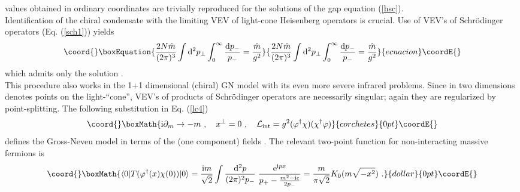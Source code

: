 \documentclass[a4paper,12pt]{article}
\begin{document}
values obtained in ordinary coordinates are trivially reproduced for the solutions of the gap equation
(\ref{hsc}).\\
Identification of the chiral condensate with the limiting  VEV of light-cone Heisenberg operators is
crucial. Use of VEV's of Schr\"odinger operators (Eq. (\ref{sch1})) yields
\begin{equation}\coord{}\boxEquation{
  \label{njlv}
\frac{2N\hat{m}}{(2 \pi)^{3}} \int {\rm d}^{2}p_{\perp}
    \int^{\infty}_{0} \frac{{\rm d} p _{-}}{p_{-}}  =  \frac{\hat{m}}{g^2}
}{
  \frac{2N\hat{m}}{(2 \pi)^{3}} \int {\rm d}^{2}p_{\perp}
    \int^{\infty}_{0} \frac{{\rm d} p _{-}}{p_{-}}  =  \frac{\hat{m}}{g^2}
}{ecuacion}\coordE{}\end{equation}
which admits only the solution \coordHE{}. \\
This  procedure also works in the 1+1 dimensional (chiral) GN model with its even more severe
infrared problems. Since in two dimensions \coordHE{} denotes points on the light-``cone'', VEV's
of products of Schr\"odinger operators are necessarily singular;  again they are regularized by
point-splitting. The following substitution in Eq. (\ref{lc4})
\begin{displaymath}\coord{}\boxMath{
  {\rm i}\partial_{m} \rightarrow -m \ , \quad x^{\perp} =0\ , \quad
 {\cal L}_{\rm int} = g^{2}(\varphi^{\dagger}\chi)(
  \chi^{\dagger}\varphi)
}{corchetes}{0pt}\coordE{}\end{displaymath}
defines the Gross-Neveu model in terms of the (one component) fields \myHighlight{$\varphi,\chi$}\coordHE{}. The
relevant two-point function for non-interacting massive fermions is
$$\coord{}\boxMath{ \langle 0|T(\varphi^{\dagger}(x)\chi(0))| 0 \rangle =\frac{{\rm i}m}{\sqrt{2}}
\int \frac{{\rm d}^{2}p}{(2 \pi)^{2}p_{-}} \; \frac{ {\rm e}^{{\rm i} p x}}{ p _{+}  -
\frac{m^{2} - {\rm i} \epsilon}{2 p_{-}}} = \frac{m}{\pi\sqrt{2}}K_{0}(m\sqrt{-x^{2}}) \ .     }{dollar}{0pt}\coordE{}$$
\end{document}
